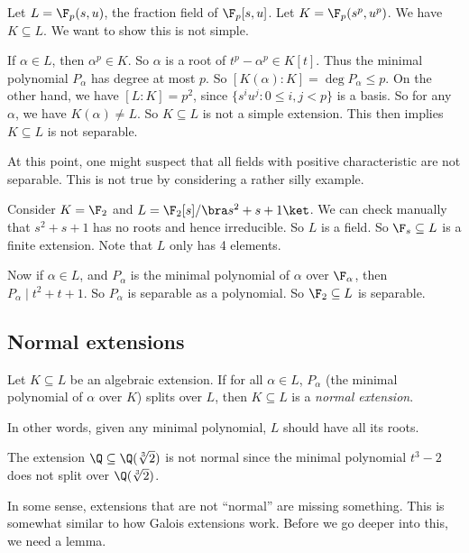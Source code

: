 \documentclass[a4paper]{article}
\begin{document}
\begin{eg}
  Let $L = \F_p(s, u)$, the fraction field of $\F_p[s, u]$. Let $K = \F_p(s^p, u^p)$. We have $K\subseteq L$. We want to show this is not simple.

  If $\alpha \in L$, then $\alpha^p \in K$. So $\alpha$ is a root of $t^p - \alpha^p \in K[t]$. Thus the minimal polynomial $P_\alpha$ has degree at most $p$. So $[K(\alpha): K] = \deg P_\alpha \leq p$. On the other hand, we have $[L:K] = p^2$, since $\{s^iu^j: 0 \leq i, j < p\}$ is a basis. So for any $\alpha$, we have $K(\alpha) \not= L$. So $K\subseteq L$ is not a simple extension. This then implies $K\subseteq L$ is not separable.
\end{eg}
At this point, one might suspect that all fields with positive characteristic are not separable. This is not true by considering a rather silly example.
\begin{eg}
  Consider $K = \F_2$ and $L = \F_2[s]/\bra s^2 + s + 1\ket$. We can check manually that $s^2 + s + 1$ has no roots and hence irreducible. So $L$ is a field. So $\F_s \subseteq L$ is a finite extension. Note that $L$ only has 4 elements.

  Now if $\alpha \in L$, and $P_\alpha$ is the minimal polynomial of $\alpha$ over $\F_\alpha$, then $P_\alpha\mid t^2 + t + 1$. So $P_\alpha$ is separable as a polynomial. So $\F_2 \subseteq L$ is separable.
\end{eg}

\subsection{Normal extensions}

\begin{defi}
  Let $K \subseteq L$ be an algebraic extension. If for all $\alpha \in L$, $P_\alpha$ (the minimal polynomial of $\alpha$ over $K$) splits over $L$, then $K\subseteq L$ is a \emph{normal extension}.
\end{defi}
In other words, given any minimal polynomial, $L$ should have all its roots.

\begin{eg}
  The extension $\Q\subseteq \Q(\sqrt[3]{2})$ is not normal since the minimal polynomial $t^3 - 2$ does not split over $\Q(\sqrt[3]{2})$.
\end{eg}
In some sense, extensions that are not ``normal'' are missing something. This is somewhat similar to how Galois extensions work. Before we go deeper into this, we need a lemma.
\end{document}

